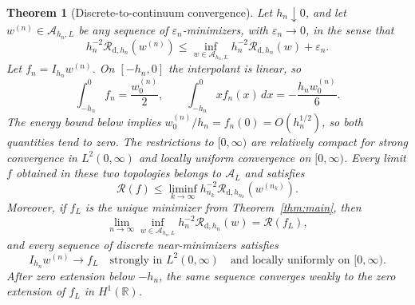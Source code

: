 \documentclass[11pt]{amsart}
\newtheorem{theorem}{Theorem}[section]
\theoremstyle{definition}
\theoremstyle{remark}
\newcommand{\Rcal}{\mathcal R}
\begin{document}
\begin{theorem}[Discrete-to-continuum convergence]
\label{thm:discrete-continuum}
Let $h_n\downarrow0$, and let $w^{(n)}\in\mathcal A_{h_n,L}$ be any sequence of
$\varepsilon_n$-minimizers, with $\varepsilon_n\to0$, in the sense that
\[
 h_n^{-2}\Rcal_{\mathrm d,h_n}(w^{(n)})
 \leq \inf_{w\in\mathcal A_{h_n,L}}
       h_n^{-2}\Rcal_{\mathrm d,h_n}(w)+\varepsilon_n.
\]
Let $f_n=I_{h_n}w^{(n)}$. On $[-h_n,0]$ the interpolant is linear, so
\[
 \int_{-h_n}^0 f_n=\frac{w^{(n)}_0}{2},
 \qquad
 \int_{-h_n}^0 x f_n(x)\,dx=-\frac{h_n w^{(n)}_0}{6}.
\]
The energy bound below implies $w^{(n)}_0/h_n=f_n(0)=O(h_n^{1/2})$, so both
quantities tend to zero. The restrictions to $[0,\infty)$ are relatively
compact for strong convergence in $L^2(0,\infty)$ and locally uniform
convergence on $[0,\infty)$. Every limit $f$ obtained in these two topologies
belongs to $\mathcal A_L$ and satisfies
\[
 \Rcal(f)\leq\liminf_{k\to\infty}
 h_{n_k}^{-2}\Rcal_{\mathrm d,h_{n_k}}(w^{(n_k)}).
\]
Moreover, if $f_L$ is the unique minimizer from Theorem~\ref{thm:main}, then
\[
 \lim_{n\to\infty}
 \inf_{w\in\mathcal A_{h_n,L}}
 h_n^{-2}\Rcal_{\mathrm d,h_n}(w)
 =\Rcal(f_L),
\]
and every sequence of discrete near-minimizers satisfies
\[
 I_{h_n}w^{(n)}\longrightarrow f_L
 \quad\text{strongly in }L^2(0,\infty)
 \quad\text{and locally uniformly on }[0,\infty).
\]
After zero extension below $-h_n$, the same sequence converges weakly to the
zero extension of $f_L$ in $H^1(\mathbb R)$.
\end{theorem}
\end{document}
